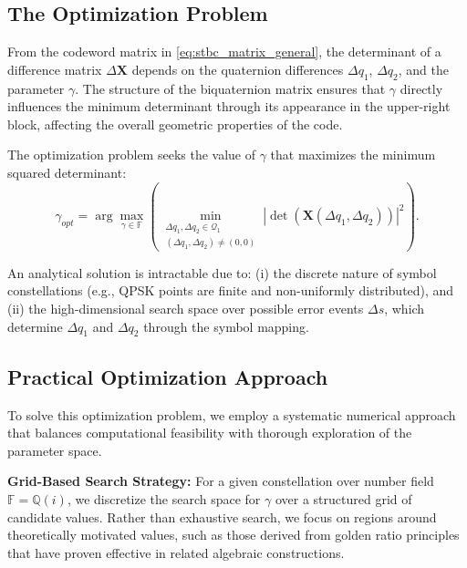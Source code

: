 \documentclass[twocolumn,conference]{IEEEtran}
\begin{document}
\subsection{The Optimization Problem}
From the codeword matrix in \eqref{eq:stbc_matrix_general}, the determinant of a difference matrix $\Delta\mathbf{X}$ depends on the quaternion differences $\Delta q_1$, $\Delta q_2$, and the parameter $\gamma$. The structure of the biquaternion matrix ensures that $\gamma$ directly influences the minimum determinant through its appearance in the upper-right block, affecting the overall geometric properties of the code.

The optimization problem seeks the value of $\gamma$ that maximizes the minimum squared determinant:
\begin{equation} \label{eq:optimization}
\gamma_{opt} = \arg \max_{\gamma \in \mathbb{F}} \left( \min_{\substack{\Delta q_1, \Delta q_2 \in \mathcal{Q}_1 \\ (\Delta q_1, \Delta q_2) \neq (0,0)}} |\det(\mathbf{X}(\Delta q_1, \Delta q_2))|^2 \right).
\end{equation}

An analytical solution is intractable due to: 
(i) the discrete nature of symbol constellations (e.g., QPSK points are finite and non-uniformly distributed), and 
(ii) the high-dimensional search space over possible error events $\Delta s$, which determine $\Delta q_1$ and $\Delta q_2$ through the symbol mapping.

\subsection{Practical Optimization Approach}
To solve this optimization problem, we employ a systematic numerical approach that balances computational feasibility with thorough exploration of the parameter space.

\textbf{Grid-Based Search Strategy:} For a given constellation over number field $\mathbb{F} = \mathbb{Q}(i)$, we discretize the search space for $\gamma$ over a structured grid of candidate values. 
Rather than exhaustive search, we focus on regions around theoretically motivated values, such as those derived from golden ratio principles that have proven effective in related algebraic constructions.
\end{document}
